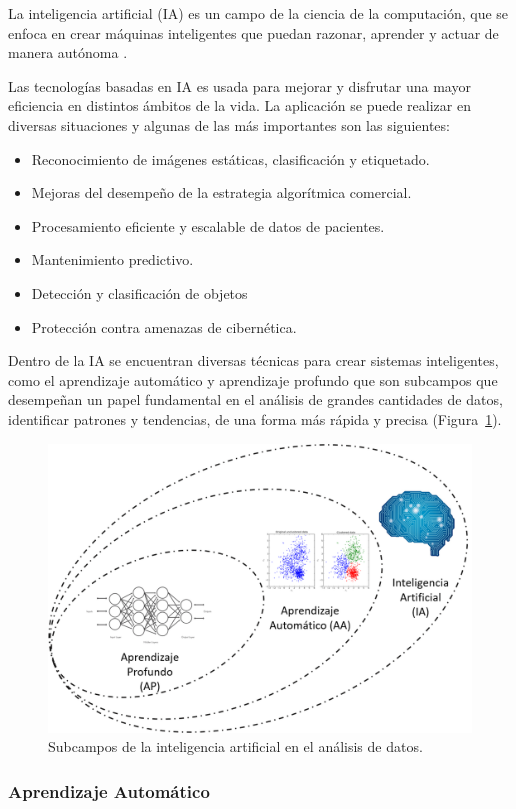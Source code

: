 La inteligencia artificial (IA) es un campo de la ciencia de la computación, que se enfoca en crear máquinas inteligentes que puedan razonar, aprender y actuar de manera autónoma \citep{rouhiainen2018inteligencia}.

Las tecnologías basadas en IA es usada para mejorar y disfrutar una mayor eficiencia en distintos ámbitos de la vida. La aplicación se puede realizar en diversas situaciones y algunas de las más importantes son las siguientes:

\begin{itemize}
    \item Reconocimiento de imágenes estáticas, clasificación y etiquetado.
    \item Mejoras del desempeño de la estrategia algorítmica comercial.
    \item Procesamiento eficiente y escalable de datos de pacientes.
    \item Mantenimiento predictivo.
    \item Detección y clasificación de objetos
    \item Protección contra amenazas de cibernética.
\end{itemize}

Dentro de la IA se encuentran diversas técnicas para crear sistemas inteligentes, como el aprendizaje automático y aprendizaje profundo que son subcampos que desempeñan un papel fundamental en el análisis de grandes cantidades de datos, identificar patrones y tendencias, de una forma más rápida y precisa (Figura~\ref{fig:IA_AA_A}).

  \begin{figure}[!h]
     \centering
     \includegraphics[width=.5\textwidth]{Imagenes/IA_AA_AP.png}
     \caption{Subcampos de la inteligencia artificial en el análisis de datos.}
     \label{fig:IA_AA_A}
 \end{figure}


\subsubsection{Aprendizaje Automático}


